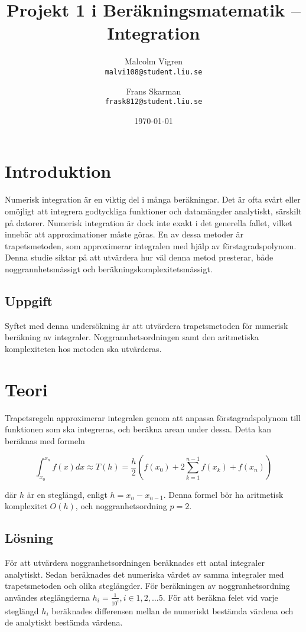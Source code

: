 \documentclass[a4paper,titlepage]{article}
\title{
    \textbf{Projekt 1 i Beräkningsmatematik -- Integration }}
\date{\today}
\author{%
    Malcolm Vigren \\
    \texttt{malvi108@student.liu.se}
    \and
    Frans Skarman\\
    \texttt{frask812@student.liu.se}
    }
\begin{document}
\maketitle
\newpage
\tableofcontents
\newpage

\section{Introduktion}
Numerisk integration är en viktig del i många beräkningar. Det är ofta svårt
eller omöjligt att integrera godtyckliga funktioner och datamängder analytiskt,
särskilt på datorer. Numerisk integration är dock inte exakt i det generella
fallet, vilket innebär att approximationer måste göras. En av dessa metoder
är trapetsmetoden, som approximerar integralen med hjälp av förstagradspolynom.
Denna studie siktar på att utvärdera hur väl denna metod presterar,
både noggrannhetsmässigt och beräkningskomplexitetsmässigt.

\subsection{Uppgift}
Syftet med denna undersökning är att utvärdera trapetsmetoden för numerisk
beräkning av integraler. Noggrannhetsordningen samt den aritmetiska
komplexiteten hos metoden ska utvärderas.

\section{Teori}
Trapetsregeln approximerar integralen genom att anpassa förstagradspolynom till
funktionen som ska integreras, och beräkna arean under dessa. Detta kan
beräknas med formeln

\begin{equation}
    \int_{x_0}^{x_n}f(x)dx \approx T(h) = \frac{h}{2}(f(x_0) +
    2\sum_{k=1}^{n-1}f(x_k) + f(x_n))
\end{equation}

där $h$ är en steglängd, enligt $h = x_n - x_{n-1}$. Denna formel bör
ha aritmetisk komplexitet $O(h)$, och noggranhetsordning $p=2$.

\subsection{Lösning}

För att utvärdera noggranhetsordningen beräknades ett antal integraler
analytiskt. Sedan beräknades det numeriska värdet av samma integraler med
trapetsmetoden och olika steglängder. För beräkningen av noggranhetsordning
användes steglängderna $h_i = \frac{1}{10^i}, i \in {1,2, \dots 5}$.
För att beräkna felet vid varje steglängd $h_i$ beräknades differensen mellan de numeriskt
bestämda värdena och de analytiskt bestämda värdena.
\end{document}
